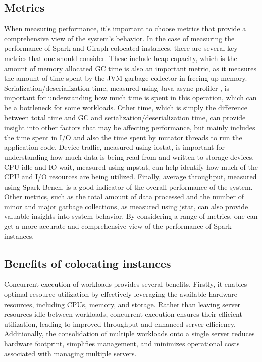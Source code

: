 \subsection{Metrics} 
When measuring performance, it's
important to choose metrics that provide a comprehensive view of the
system's behavior. In the case of measuring the performance of Spark and Giraph
colocated instances, there are several key metrics that one should consider.
These include heap capacity, which is the amount of memory allocated
GC time is also an
important metric, as it measures the amount of time spent by the JVM
garbage collector in freeing up memory. Serialization/deserialization
time, measured using Java async-profiler \cite{Profiler}, is important for
understanding how much time is spent in this operation, which can be a
bottleneck for some workloads. Other time, which is simply the
difference between total time and GC and serialization/deserialization
time, can provide insight into other factors that may be affecting
performance, but mainly includes the time spent in I/O and also the
time spent by mutator threads to run the application code. Device
traffic, measured using iostat, is important for understanding how
much data is being read from and written to storage devices. CPU idle
and IO wait, measured using mpstat, can help identify how much of the
CPU and I/O resources are being utilized. Finally, average throughput,
measured using Spark Bench, is a good indicator of the overall
performance of the system. Other metrics, such as the total amount of
data processed and the number of minor and major garbage collections,
as measured using jstat, can also provide valuable insights into
system behavior. By considering a range of metrics, one can get a more
accurate and comprehensive view of the performance of Spark instances.
\fi
\iffalse
\subsection{Benefits of colocating instances} 
Concurrent execution of workloads provides several benefits.
Firstly, it enables optimal resource utilization by effectively
leveraging the available hardware resources, including CPUs, memory,
and storage. Rather than leaving server resources idle between
workloads, concurrent execution ensures their efficient utilization,
leading to improved throughput and enhanced server efficiency.
Additionally, the consolidation of multiple workloads onto a single
server reduces hardware footprint, simplifies management, and
minimizes operational costs associated with managing multiple servers.

